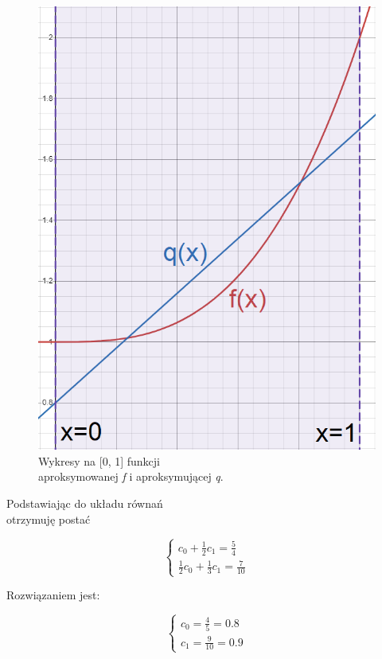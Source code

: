 \documentclass{article}
\begin{document}
\begin{figure}
    \centering
    \includegraphics[width=\linewidth]{graph1.png}
    \caption{Wykresy na [0, 1] funkcji\\
    aproksymowanej \textit{f} i aproksymującej \textit{q}.}
\end{figure}
\vspace{5mm}

\noindent
Podstawiając do układu równań\\
otrzymuję postać

\[\left\{
\begin{array}{l}
    c_0 + \frac{1}{2}c_1 = \frac{5}{4}\\
    \frac{1}{2}c_0 + \frac{1}{3}c_1 = \frac{7}{10}
\end{array}
\right.\]

Rozwiązaniem jest:

\[\left\{
\begin{array}{l}
    c_0 = \frac{4}{5} = 0.8\\
    c_1 = \frac{9}{10} = 0.9
\end{array}
\right.\]
\end{document}
